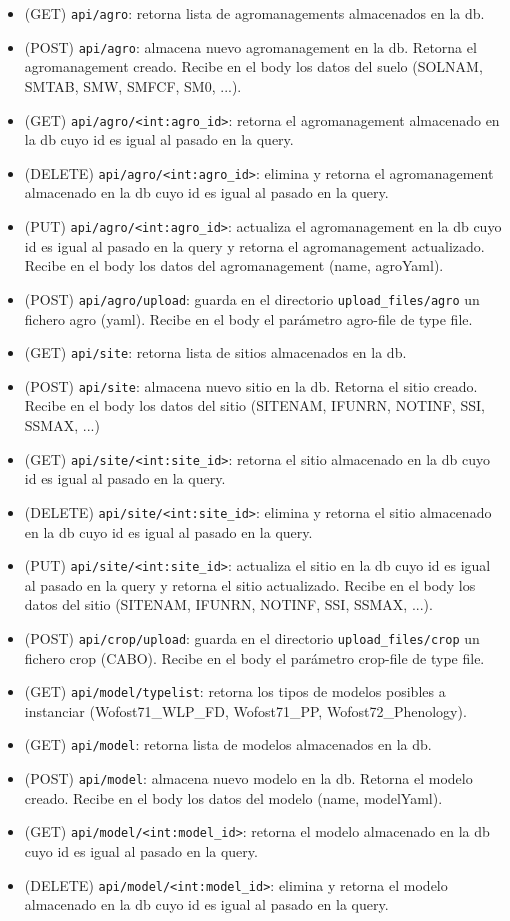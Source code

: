 \begin{itemize}
	\item (GET) \lstinline|api/agro|: retorna lista de agromanagements almacenados en la db.
	\item (POST) \lstinline|api/agro|: almacena nuevo agromanagement en la db. Retorna el agromanagement creado. Recibe en el body los datos del suelo (SOLNAM, SMTAB, SMW, SMFCF, SM0, ...).
	\item (GET) \lstinline|api/agro/<int:agro_id>|: retorna el agromanagement almacenado en la db cuyo id es igual al pasado en la query.
	\item (DELETE) \lstinline|api/agro/<int:agro_id>|: elimina y retorna el agromanagement almacenado en la db cuyo id es igual al pasado en la query.
	\item (PUT) \lstinline|api/agro/<int:agro_id>|: actualiza el agromanagement en la db cuyo id es igual al pasado en la query y retorna el agromanagement actualizado. Recibe en el body los datos del agromanagement (name, agroYaml).
	\item (POST) \lstinline|api/agro/upload|: guarda en el directorio \lstinline|upload_files/agro| un fichero agro (yaml). Recibe en el body el parámetro agro-file de type file.
	
	\item (GET) \lstinline|api/site|: retorna lista de sitios almacenados en la db.
	\item (POST) \lstinline|api/site|: almacena nuevo sitio en la db. Retorna el sitio creado. Recibe en el body los datos del sitio (SITENAM, IFUNRN, NOTINF, SSI, SSMAX, ...)
	\item (GET) \lstinline|api/site/<int:site_id>|: retorna el sitio almacenado en la db cuyo id es igual al pasado en la query.
	\item (DELETE) \lstinline|api/site/<int:site_id>|: elimina y retorna el sitio almacenado en la db cuyo id es igual al pasado en la query.
	\item (PUT) \lstinline|api/site/<int:site_id>|: actualiza el sitio en la db cuyo id es igual al pasado en la query y retorna el sitio actualizado. Recibe en el body los datos del sitio (SITENAM, IFUNRN, NOTINF, SSI, SSMAX, ...).
	\item (POST) \lstinline|api/crop/upload|: guarda en el directorio \lstinline|upload_files/crop| un fichero crop (CABO). Recibe en el body el parámetro crop-file de type file.
	
	\item (GET) \lstinline|api/model/typelist|: retorna los tipos de modelos posibles a instanciar (Wofost71\_WLP\_FD, Wofost71\_PP, Wofost72\_Phenology).
	\item (GET) \lstinline|api/model|: retorna lista de modelos almacenados en la db.
	\item (POST) \lstinline|api/model|: almacena nuevo modelo en la db. Retorna el modelo creado. Recibe en el body los datos del modelo (name, modelYaml).
	\item (GET) \lstinline|api/model/<int:model_id>|: retorna el modelo almacenado en la db cuyo id es igual al pasado en la query.
	\item (DELETE) \lstinline|api/model/<int:model_id>|: elimina y retorna el modelo almacenado en la db cuyo id es igual al pasado en la query.
	

\end{itemize}
